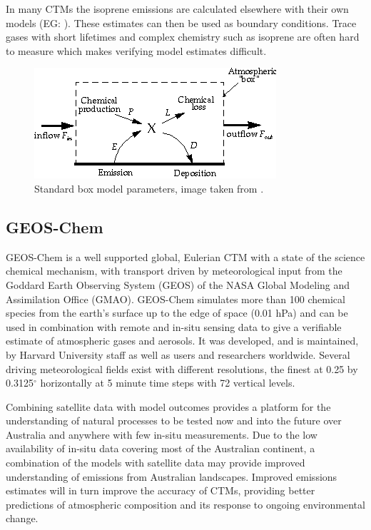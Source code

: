       
    In many CTMs the isoprene emissions are calculated elsewhere with their own models (EG: \citet{Guenther2006}). These estimates can then be used as boundary conditions. Trace gases with short lifetimes and complex chemistry such as isoprene are often hard to measure which makes verifying model estimates difficult.

    \begin{figure}
      \includegraphics{Figures/boxmodel.png}
      \caption{ Standard box model parameters, image taken from \citet{Jacob_1999_book}. }
      \label{ch1:fig:boxmodel}
    \end{figure}

    
  \subsection{GEOS-Chem}
  
    GEOS-Chem is a well supported global, Eulerian CTM with a state of the science chemical mechanism, with transport driven by meteorological input from the Goddard Earth Observing System (GEOS) of the NASA Global Modeling and Assimilation Office (GMAO).
    GEOS-Chem simulates more than 100 chemical species from the earth's surface up to the edge of space (0.01 hPa) and can be used in combination with remote and in-situ sensing data to give a verifiable estimate of atmospheric gases and aerosols.
    It was developed, and is maintained, by Harvard University staff as well as users and researchers worldwide. 
    Several driving meteorological fields exist with different resolutions, the finest at 0.25 by 0.3125$^\circ$ horizontally at 5 minute time steps with 72 vertical levels.

    Combining satellite data with model outcomes provides a platform for the understanding of natural processes to be tested now and into the future over Australia and anywhere with few in-situ measurements.
    Due to the low availability of in-situ data covering most of the Australian continent, a combination of the models with satellite data may provide improved understanding of emissions from Australian landscapes.
    Improved emissions estimates will in turn improve the accuracy of CTMs, providing better predictions of atmospheric composition and its response to ongoing environmental change.

